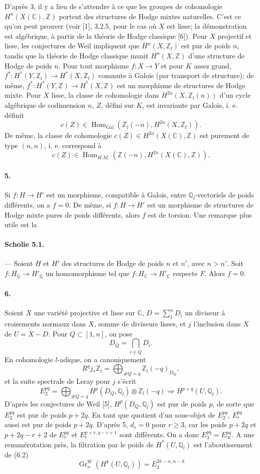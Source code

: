 \documentclass[10pt]{article}
\newcommand{\C}{\mathbb C}
\newcommand{\Q}{\mathbb Q}
\newcommand{\Z}{\mathbb Z}
\newcommand{\Gr}{\operatorname{Gr}}
\newcommand{\Gal}{\operatorname{Gal}}
\newcommand{\Hom}{\operatorname{Hom}}
\begin{document}
D'après 3, il y a lieu de s'attendre à ce que les groupes de cohomologie $H^n(X(\C),\Z)$ portent des structures de Hodge mixtes naturelles. C'est ce qu'on peut prouver (voir [1], 3.2.5, pour le cas où $X$ est lisse; la démonstration est algébrique, à partir de la théorie de Hodge classique [6]). Pour $X$ projectif et lisse, les conjectures de Weil impliquent que $H^n(X,\Z_l)$ est pur de poids $n$, tandis que la théorie de Hodge classique munit $H^n(X,\Z)$ d'une structure de Hodge de poids $n$. Pour tout morphisme $f:X\to Y$ et pour $K$ assez grand, $f^*:H^*(Y,\Z_l)\to H^*(X,\Z_l)$ commute à Galois (par transport de structure); de même, $f^*:H^*(Y,\Z)\to H^*(X,\Z)$ est un morphisme de structures de Hodge mixte. Pour $X$ lisse, la classe de cohomologie dans $H^{2n}(X,\Z_l(n))$ d'un cycle algébrique de codimension $n$, $Z$, défini sur $K$, est invariante par Galois, i. e. définit
\[
c(Z)\in\Hom_{\Gal}(\Z_l(-n),H^{2n}(X,\Z_l)).
\]
De même, la classe de cohomologie $c(Z)\in H^{2n}(X(\C),\Z)$ est purement de type $(n,n)$, i. e. correspond à
\[
c(Z)\in\Hom_{H.M.}(\Z(-n),H^{2n}(X(\C),\Z)).
\]

\paragraph{5.} Si $f:H\to H'$ est un morphisme, compatible à Galois, entre $\Q_l$-vectoriels de poids différents, on a $f=0$. De même, si $f:H\to H'$ est un morphisme de structures de Hodge mixte pures de poids différents, alors $f$ est de torsion. Une remarque plus utile est la %

\paragraph{Scholie 5.1.} — Soient $H$ et $H'$ des structures de Hodge de poids $n$ et $n'$, avec $n>n'$. Soit $f:H_\Q\to H'_\Q$ un homomorphisme tel que $f:H_\C\to H'_\C$ respecte $F$. Alors $f=0$.

\paragraph{6.} Soient $X$ une variété projective et lisse sur $\C$, $D=\sum_1^n D_i$ un diviseur à croisements normaux dans $X$, somme de diviseurs lisses, et $j$ l'inclusion dans $X$ de $U=X-D$. Pour $Q\subset[1,n]$, on pose
\[
D_Q=\bigcap_{i\in Q}D_i.
\]
En cohomologie $l$-adique, on a canoniquement
\[
\tag{6.1}
R^qj_*\Z_l=\bigoplus_{\#Q=q}\Z_l(-q)_{D_Q},
\]
et la suite spectrale de Leray pour $j$ s'écrit
\[
\tag{6.2}
E_2^{pq}=\bigoplus_{\#Q=q}H^p(D_Q,\Q_l)\otimes\Z_l(-q)\Rightarrow H^{p+q}(U,\Q_l).
\]
D'après les conjectures de Weil [5], $H^p(D_Q,\Q_l)$ est pur de poids $p$, de sorte que $E_2^{pq}$ est pur de poids $p+2q$. En tant que quotient d'un sous-objet de $E_2^{pq}$, $E_r^{pq}$ aussi est pur de poids $p+2q$. D'après 5, $d_r=0$ pour $r\ge3$, car les poids $p+2q$ et $p+2q-r+2$ de $E_r^{pq}$ et $E_r^{p+r,q-r+1}$ sont différents. On a donc $E_3^{pq}=E_\infty^{pq}$. A une renumérotation près, la filtration par le poids de $H^*(U,\Q_l)$ est l'aboutissement de (6.2)
\[
\tag{6.3}
\Gr_n^W(H^k(U,\Q_l))=E_3^{2k-n,n-k}
\]
\end{document}
